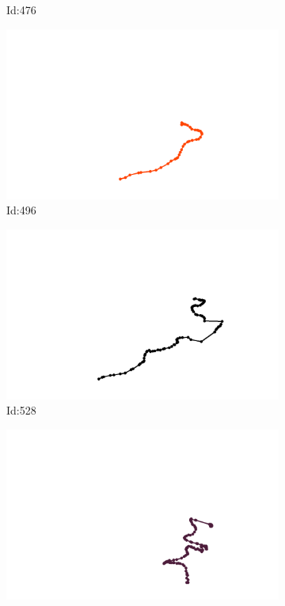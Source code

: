 \documentclass[12pt,twoside]{report}
\begin{document}
\begin{figure}
\begin{subfigure}[b]{0.20\textwidth}
\caption{Id:476}
\end{subfigure}
\begin{subfigure}[b]{0.20\textwidth}
\centering
\includegraphics[width=\textwidth]{../trajectories/496.png}
\caption{Id:496}
\end{subfigure}
\begin{subfigure}[b]{0.20\textwidth}
\centering
\includegraphics[width=\textwidth]{../trajectories/528.png}
\caption{Id:528}
\end{subfigure}
\begin{subfigure}[b]{0.20\textwidth}
\centering
\includegraphics[width=\textwidth]{../trajectories/571.png}

\end{subfigure}
\end{figure}
\end{document}
